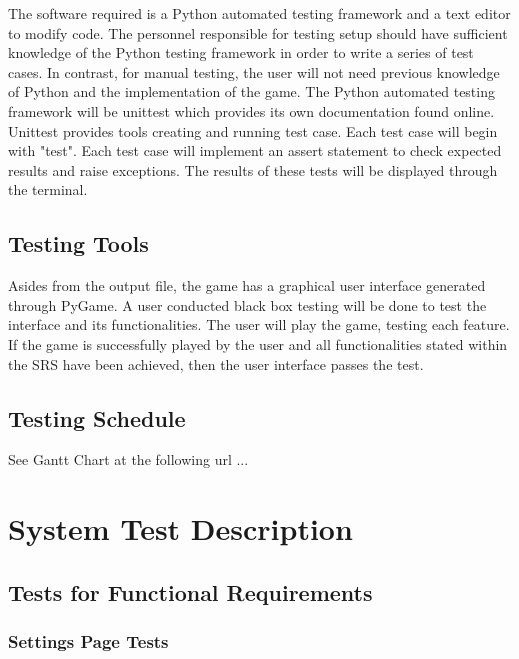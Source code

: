 \documentclass[12pt, titlepage]{article}
\begin{document}
The software required is a Python automated testing framework and a text editor to modify code. The personnel responsible for testing setup should have sufficient knowledge of the Python testing framework in order to write a series of test cases. In contrast, for manual testing, the user will not need previous knowledge of Python and the implementation of the game. The Python automated testing framework will be unittest which provides its own documentation found online. Unittest provides tools creating and running test case. Each test case will begin with "test". Each test case will implement an assert statement to check expected results and raise exceptions. The results of these tests will be displayed through the terminal.


\subsection{Testing Tools}

Asides from the output file, the game has a graphical user interface generated through PyGame. A user conducted black box testing will be done to test the interface and its functionalities. The user will play the game, testing each feature. If the game is successfully played by the user and all functionalities stated within the SRS have been achieved, then the user interface passes the test.


\subsection{Testing Schedule}
		
See Gantt Chart at the following url ...

\section{System Test Description}
	
\subsection{Tests for Functional Requirements}
\subsubsection{Settings Page Tests}
\end{document}
